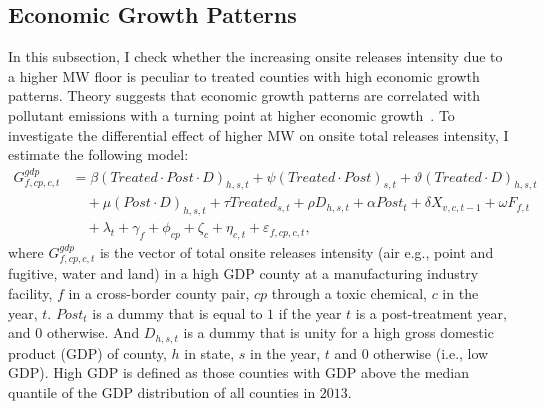\documentclass[12pt, english]{article}
\begin{document}
    \subsection{Economic Growth Patterns}\label{subsec:economic-growth-patterns}
    In this subsection, I check whether the increasing onsite releases intensity due to a higher MW floor is peculiar to treated counties with high economic growth patterns. Theory suggests that economic growth patterns are correlated with pollutant emissions with a turning point at higher economic growth~\parencite{grossman1995economic, shapiro2018pollution}. To investigate the differential effect of higher MW on onsite total releases intensity, I estimate the following model:
    \begin{align}
        G_{f,cp,c,t}^{gdp} &= \beta (Treated \cdot Post \cdot D)_{h,s,t} + \psi (Treated \cdot Post)_{s,t} + \vartheta (Treated \cdot D)_{h,s,t} \nonumber \\
        &\quad + \mu (Post \cdot D)_{h,s,t} + \tau Treated_{s,t} + \rho D_{h,s,t} + \alpha Post_{t} + \delta X_{v,c,t-1} + \omega F_{f,t} \nonumber \\
        &\quad + \lambda_{t} + \gamma_{f} + \phi_{cp} + \zeta_{c} + \eta_{c,t} + \varepsilon_{f,cp,c,t},\label{eq:heterogeneous-onsite-releases-intensity-gdp}
    \end{align}
    where $G_{f,cp,c,t}^{gdp}$ is the vector of total onsite releases intensity (air e.g., point and fugitive, water and land) in a high GDP county at a manufacturing industry facility, $f$  in a cross-border county pair, $cp$ through a toxic chemical, $c$ in the year, $t$. $Post_{t}$ is a dummy that is equal to $1$ if the year $t$ is a post-treatment year, and $0$ otherwise. And $D_{h,s,t}$ is a dummy that is unity for a high gross domestic product (GDP) of county, $h$ in state, $s$ in the year, $t$ and $0$ otherwise (i.e., low GDP). High GDP is defined as those counties with GDP above the median quantile of the GDP distribution of all counties in $2013$.
    
\end{document}
